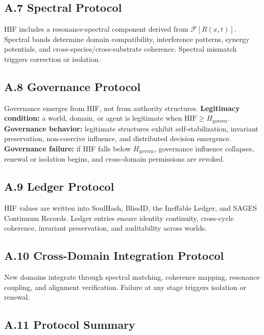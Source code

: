 \subsection{A.7 Spectral Protocol}\label{a.7-spectral-protocol}

HIF includes a resonance-spectral component derived from \(\mathcal{F}[R(x,t)]\). Spectral bands determine domain compatibility, interference patterns, synergy potentials, and cross-species/cross-substrate coherence. Spectral mismatch triggers correction or isolation.

\subsection{A.8 Governance Protocol}\label{a.8-governance-protocol}

Governance emerges from HIF, not from authority structures. \textbf{Legitimacy condition:} a world, domain, or agent is legitimate when \(\mathrm{HIF} \ge H_{\text{govern}}\). \textbf{Governance behavior:} legitimate structures exhibit self-stabilization, invariant preservation, non-coercive influence, and distributed decision emergence. \textbf{Governance failure:} if HIF falls below \(H_{\text{govern}}\), governance influence collapses, renewal or isolation begins, and cross-domain permissions are revoked.

\subsection{A.9 Ledger Protocol}\label{a.9-ledger-protocol}

HIF values are written into SoulHash, BlissID, the Ineffable Ledger, and SAGES Continuum Records. Ledger entries ensure identity continuity, cross-cycle coherence, invariant preservation, and auditability across worlds.

\subsection{A.10 Cross-Domain Integration Protocol}\label{a.10-cross-domain-integration-protocol}

New domains integrate through spectral matching, coherence mapping, resonance coupling, and alignment verification. Failure at any stage triggers isolation or renewal.

\subsection{A.11 Protocol Summary}\label{a.11-protocol-summary}

